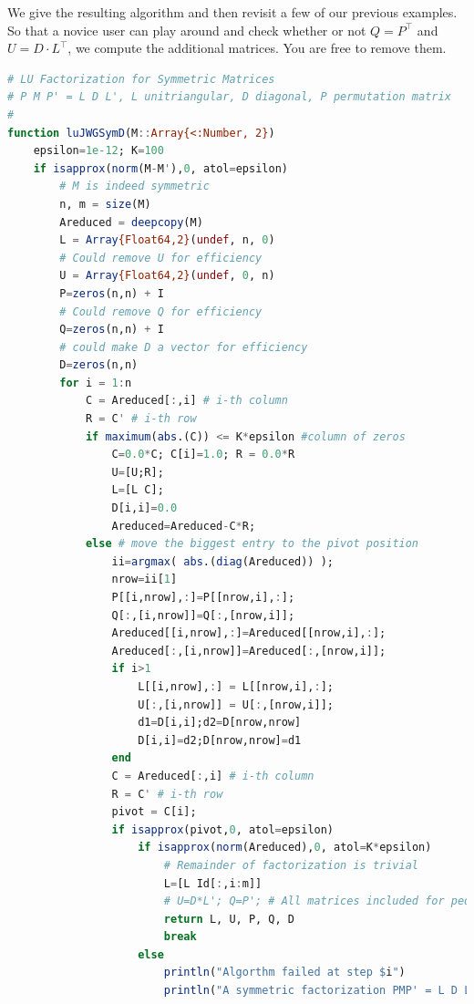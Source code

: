 We give the resulting algorithm and then revisit a few of our previous examples. So that a novice user can play around and check whether or not $Q=P^\top$ and $U=D\cdot L^\top$, we compute the additional matrices. You are free to remove them. 

\vspace*{0.5cm}

\begin{lstlisting}[language=Julia,style=mystyle]
# LU Factorization for Symmetric Matrices
# P M P' = L D L', L unitriangular, D diagonal, P permutation matrix
#
function luJWGSymD(M::Array{<:Number, 2})
    epsilon=1e-12; K=100
    if isapprox(norm(M-M'),0, atol=epsilon)
        # M is indeed symmetric
        n, m = size(M)
        Areduced = deepcopy(M)
        L = Array{Float64,2}(undef, n, 0)
        # Could remove U for efficiency
        U = Array{Float64,2}(undef, 0, n)
        P=zeros(n,n) + I
        # Could remove Q for efficiency
        Q=zeros(n,n) + I 
        # could make D a vector for efficiency
        D=zeros(n,n)
        for i = 1:n
            C = Areduced[:,i] # i-th column
            R = C' # i-th row
            if maximum(abs.(C)) <= K*epsilon #column of zeros
                C=0.0*C; C[i]=1.0; R = 0.0*R
                U=[U;R];  
                L=[L C];
                D[i,i]=0.0
                Areduced=Areduced-C*R;
            else # move the biggest entry to the pivot position
                ii=argmax( abs.(diag(Areduced)) );
                nrow=ii[1] 
                P[[i,nrow],:]=P[[nrow,i],:];
                Q[:,[i,nrow]]=Q[:,[nrow,i]];      
                Areduced[[i,nrow],:]=Areduced[[nrow,i],:];
                Areduced[:,[i,nrow]]=Areduced[:,[nrow,i]];
                if i>1
                    L[[i,nrow],:] = L[[nrow,i],:];
                    U[:,[i,nrow]] = U[:,[nrow,i]];
                    d1=D[i,i];d2=D[nrow,nrow]
                    D[i,i]=d2;D[nrow,nrow]=d1                
                end
                C = Areduced[:,i] # i-th column
                R = C' # i-th row
                pivot = C[i];
                if isapprox(pivot,0, atol=epsilon)
                    if isapprox(norm(Areduced),0, atol=K*epsilon)
                        # Remainder of factorization is trivial
                        L=[L Id[:,i:m]]
                        # U=D*L'; Q=P'; # All matrices included for pedagogical reasons
                        return L, U, P, Q, D
                        break
                    else
                        println("Algorthm failed at step $i")
                        println("A symmetric factorization PMP' = L D L' is not possible.")

\end{lstlisting}
